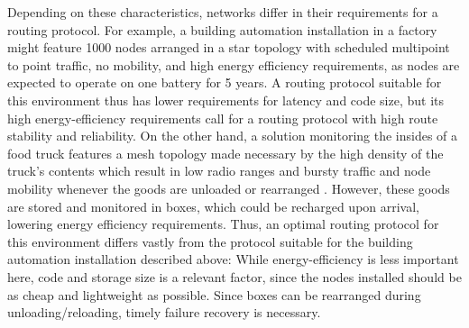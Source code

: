 \documentclass{acm_proc_article-sp}
\begin{document}
Depending on these characteristics, networks differ in their requirements for a routing protocol. For example, a building automation installation in a factory might feature 1000 nodes arranged in a star topology with scheduled multipoint to point traffic, no mobility, and high energy efficiency requirements, as nodes are expected to operate on one battery for 5 years\cite{RFC-5867}. A routing protocol suitable for this environment thus has lower requirements for latency and code size, but its high energy-efficiency requirements call for a routing protocol with high route stability and reliability.
On the other hand, a solution monitoring the insides of a food truck features a mesh topology made necessary by the high density of the truck's contents which result in low radio ranges and bursty traffic and node mobility whenever the goods are unloaded or rearranged \cite{food_monitoring}. However, these goods are stored and monitored in boxes, which could be recharged upon arrival, lowering energy efficiency requirements. Thus, an optimal routing protocol for this environment differs vastly from the protocol suitable for the building automation installation described above: While energy-efficiency is less important here, code and storage size is a relevant factor, since the nodes installed should be as cheap and lightweight as possible. Since boxes can be rearranged during unloading/reloading, timely failure recovery is necessary.
\end{document}
